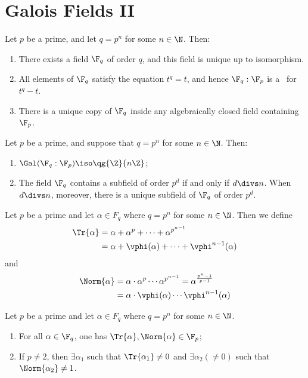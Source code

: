\documentclass[a4paper]{article}
\begin{document}
\section{Galois Fields II}

\begin{ttheorem}
  Let \( p \) be a prime, and let \( q=p^n \) for some \( n\in \N \).
  Then: \begin{enumerate}[label=(\alph*)]
    \item There exists a field \( \F_q \) of order \( q \), and this field is unique up to isomorphism.
    \item All elements of \( \F_q \) satisfy the equation \( t^q=t \), and hence \( \F_q:\F_p \) is a \sfe~for \( t^q-t \).
    \item There is a unique copy of \( \F_q \) inside any algebraically closed field containing \( \F_p \).
  \end{enumerate}
\end{ttheorem}

\begin{ttheorem}
  Let \( p \) be a prime, and suppose that \( q=p^{n} \) for some \( n\in\N \).
  Then: \begin{enumerate}[label=(\alph*)]
    \item \( \Gal(\F_q:\F_p)\iso \qg{\Z}{n\Z} \);
    \item The field \( \F_q \) contains a subfield of order \( p^d \) if and only if \( d\divs n \).
      When \( d\divs n \), moreover, there is a unique subfield of \( \F_q \) of order \( p^d \).
  \end{enumerate}
\end{ttheorem}

\begin{tdefinition}
  Let \( p \) be a prime and let \( \alpha\in F_q \) where \( q=p^{n} \) for some \( n\in\N \).
  Then we define
  \begin{align*}
    \Tr{\alpha} &= \alpha+\alpha^p + \cdots + \alpha^{p^{n-1}} \\
    &= \alpha + \vphi(\alpha) + \cdots + \vphi^{n-1}(\alpha)
  \end{align*}
  and
  \begin{align*}
    \Norm{\alpha} &= \alpha\cdot\alpha^p  \cdots  \alpha^{p^{n-1}} = \alpha^{\frac{p^{n}-1}{p-1}} \\
    &= \alpha\cdot \vphi(\alpha)\cdots \vphi^{n-1}(\alpha)
  \end{align*}
\end{tdefinition}

\begin{tlemma}
  Let \( p \) be a prime and let \( \alpha\in F_q \) where \( q=p^{n} \) for some \( n\in\N \).
  \begin{enumerate}
    \item For all \( \alpha\in \F_q \), one has \( \Tr{\alpha},\Norm{\alpha}\in \F_p \);
    \item If \( p\neq 2 \), then \( \exists\alpha_1 \) such that \( \Tr{\alpha_1}\neq 0 \) and \( \exists \alpha_2(\neq 0) \) such that \( \Norm{\alpha_2}\neq 1 \).
  \end{enumerate}
\end{tlemma}
\end{document}
